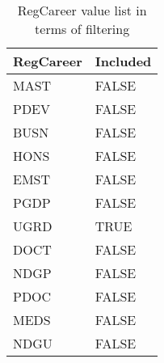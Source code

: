 \begin{table}[H]
  \centering
  \label{RegCareerFilter}
  \begin{tabular}{|l|l|}
    \hline
    \multicolumn{1}{|c|}{\textbf{RegCareer}} & \multicolumn{1}{c|}{\textbf{Included}} \\
    \hline
    MAST                                     & FALSE                                  \\
    PDEV                                     & FALSE                                  \\
    BUSN                                     & FALSE                                  \\
    HONS                                     & FALSE                                  \\
    EMST                                     & FALSE                                  \\
    PGDP                                     & FALSE                                  \\
    UGRD                                     & TRUE                                   \\
    DOCT                                     & FALSE                                  \\
    NDGP                                     & FALSE                                  \\
    PDOC                                     & FALSE                                  \\
    MEDS                                     & FALSE                                  \\
    NDGU                                     & FALSE                                  \\
    \hline
  \end{tabular}
  \caption{RegCareer value list in terms of filtering}
\end{table}


